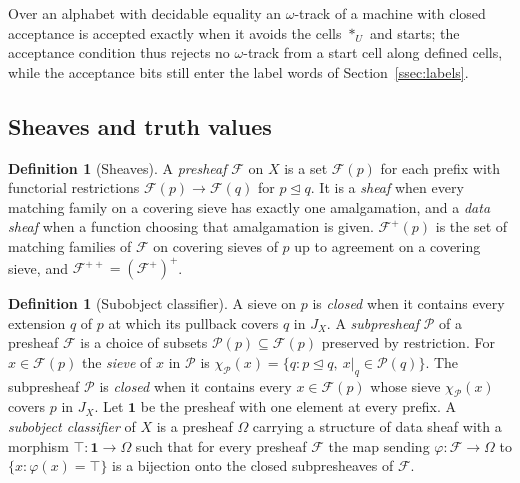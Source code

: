 \documentclass{lmcs}
\theoremstyle{definition}
\newtheorem{definition}[theorem]{Definition}
\theoremstyle{remark}
\newcommand{\ext}{\trianglelefteq}
\newcommand{\JX}[1]{J_{#1}}
\begin{document}
Over an alphabet with decidable equality an $\omega$-track of a machine with closed acceptance is accepted exactly
when it avoids the cells $\ast_U$ and starts; the acceptance
condition thus rejects no $\omega$-track from a start cell along defined cells, while the acceptance bits still enter
the label words of Section~\ref{ssec:labels}.

\subsection{Sheaves and truth values}\label{ssec:built}

\begin{definition}[Sheaves]\label{def:setup-sheaf}
A \emph{presheaf} $\mathscr{F}$ on $X$ is a set $\mathscr{F}(p)$ for each prefix with functorial restrictions
$\mathscr{F}(p)\to \mathscr{F}(q)$ for $p\ext q$. It is a \emph{sheaf} when every matching family on a covering sieve
has exactly one amalgamation, and a \emph{data sheaf} when a function choosing that amalgamation is given.
$\mathscr{F}^+(p)$ is the set of matching families of $\mathscr{F}$ on covering sieves of $p$ up to agreement on a
covering sieve, and $\mathscr{F}^{++}=(\mathscr{F}^+)^+$.
\end{definition}

\begin{definition}[Subobject classifier]\label{def:setup-omega}
A sieve on $p$ is \emph{closed} when it contains every extension $q$ of $p$ at which its pullback covers $q$ in
$\JX{X}$. A \emph{subpresheaf} $\mathscr{P}$ of a presheaf $\mathscr{F}$ is a choice of
subsets $\mathscr{P}(p)\subseteq\mathscr{F}(p)$ preserved by restriction. For
$x\in\mathscr{F}(p)$ the \emph{sieve} of $x$ in $\mathscr{P}$ is
$\chi_{\mathscr{P}}(x)=\{q : p\ext q,\ x|_q\in \mathscr{P}(q)\}$. The subpresheaf
$\mathscr{P}$ is \emph{closed} when it contains every $x\in \mathscr{F}(p)$ whose sieve $\chi_{\mathscr{P}}(x)$
covers $p$ in $\JX{X}$. Let $\mathbf{1}$ be the presheaf with one
element at every prefix. A \emph{subobject classifier} of $X$ is a presheaf $\Omega$
carrying a structure of data sheaf with a morphism $\top\colon\mathbf{1}\to\Omega$ such that for every presheaf
$\mathscr{F}$ the map sending $\varphi\colon\mathscr{F}\to\Omega$ to $\{x : \varphi(x)=\top\}$ is a bijection onto
the closed subpresheaves of $\mathscr{F}$.
\end{definition}
\end{document}
